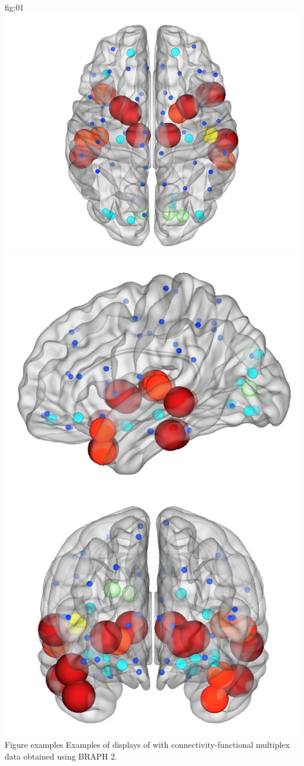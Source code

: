 \documentclass[justified]{tufte-handout}
\begin{document}
	{fig:01}
	{
	\includegraphics{fig01_01.jpg}
	\includegraphics{fig01_02.jpg}
	\includegraphics{fig01_03.jpg}
	}
	{Figure examples}
	{
	Examples of displays of  with connectivity-functional multiplex data obtained using BRAPH 2.
	}
	
\end{document}
